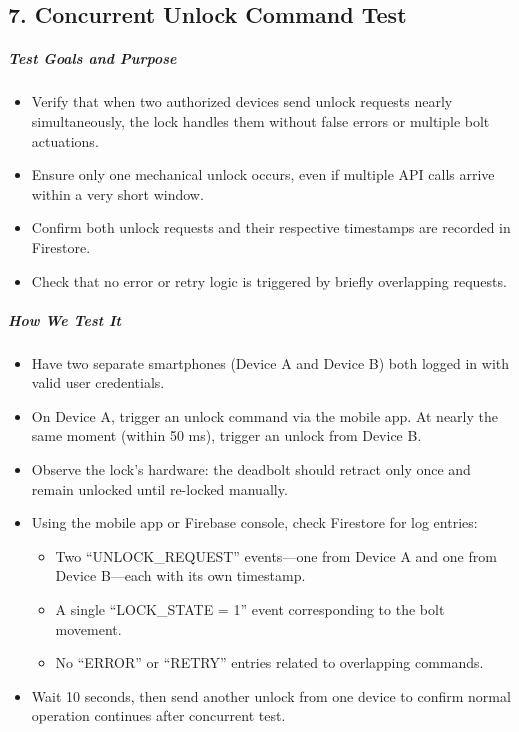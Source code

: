 \newpage
\begin{samepage}
\subsection*{7. Concurrent Unlock Command Test}

\subparagraph{Test Goals and Purpose}
\begin{itemize}
    \item Verify that when two authorized devices send unlock requests nearly simultaneously, the lock handles them without false errors or multiple bolt actuations.
    \item Ensure only one mechanical unlock occurs, even if multiple API calls arrive within a very short window.
    \item Confirm both unlock requests and their respective timestamps are recorded in Firestore.
    \item Check that no error or retry logic is triggered by briefly overlapping requests.
\end{itemize}

\subparagraph{How We Test It}
\begin{itemize}
    \item Have two separate smartphones (Device A and Device B) both logged in with valid user credentials.
    \item On Device A, trigger an unlock command via the mobile app. At nearly the same moment (within 50 ms), trigger an unlock from Device B.
    \item Observe the lock’s hardware: the deadbolt should retract only once and remain unlocked until re-locked manually.
    \item Using the mobile app or Firebase console, check Firestore for log entries:
    \begin{itemize}
        \item Two “UNLOCK\_REQUEST” events—one from Device A and one from Device B—each with its own timestamp.
        \item A single “LOCK\_STATE = 1” event corresponding to the bolt movement.
        \item No “ERROR” or “RETRY” entries related to overlapping commands.
    \end{itemize}
    \item Wait 10 seconds, then send another unlock from one device to confirm normal operation continues after concurrent test.
\end{itemize}
\end{samepage}
